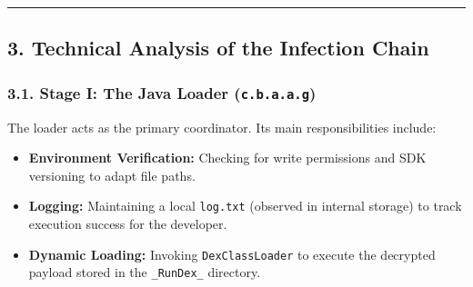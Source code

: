 \documentclass[
]{article}
\begin{document}
\begin{center}\rule{0.5\linewidth}{0.5pt}\end{center}

\subsection{\texorpdfstring{\textbf{3. Technical Analysis of the
Infection
Chain}}{3. Technical Analysis of the Infection Chain}}\label{3-technical-analysis-of-the-infection-chain}

\subsubsection{\texorpdfstring{\textbf{3.1. Stage I: The Java Loader
(\texttt{c.b.a.a.g})}}{3.1. Stage I: The Java Loader (c.b.a.a.g)}}\label{31-stage-i-the-java-loader-cbaag}

The loader acts as the primary coordinator. Its main responsibilities
include:

\begin{itemize}
\item
  \textbf{Environment Verification:} Checking for write permissions and
  SDK versioning to adapt file paths.
\item
  \textbf{Logging:} Maintaining a local \texttt{log.txt} (observed in
  internal storage) to track execution success for the developer.
\item
  \textbf{Dynamic Loading:} Invoking \texttt{DexClassLoader} to execute
  the decrypted payload stored in the \texttt{\_RunDex\_} directory.
\end{itemize}
\end{document}
